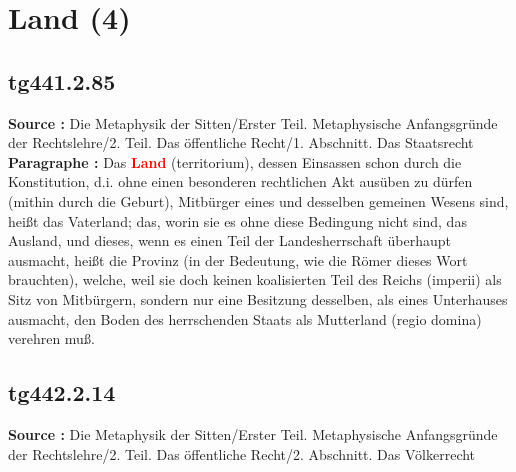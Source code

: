 \documentclass[a4paper,12pt,twoside]{book}
\newcommand{\match}[1]{\textcolor{red}{\textbf{#1}}}
\newcommand{\unnumberedsection}[1]{
	\section*{#1}
	\addcontentsline{toc}{section}{#1}
	\markright{#1}
}
\begin{document}
	\unnumberedsection{Land (4)} 
	\subsection*{tg441.2.85} 
	\textbf{Source : }Die Metaphysik der Sitten/Erster Teil. Metaphysische Anfangsgründe der Rechtslehre/2. Teil. Das öffentliche Recht/1. Abschnitt. Das Staatsrecht\\  
	
	\textbf{Paragraphe : }Das \match{Land} (territorium), dessen Einsassen schon durch die Konstitution, d.i. ohne einen besonderen rechtlichen Akt ausüben zu dürfen (mithin durch die Geburt), Mitbürger eines und desselben gemeinen Wesens sind, heißt das Vaterland; das, worin sie es ohne diese Bedingung nicht sind, das Ausland, und dieses, wenn es einen Teil der Landesherrschaft überhaupt ausmacht, heißt die Provinz (in der Bedeutung, wie die Römer dieses Wort brauchten), welche, weil sie doch keinen koalisierten Teil des Reichs (imperii) als Sitz von Mitbürgern, sondern nur eine Besitzung desselben, als eines Unterhauses ausmacht, den Boden des herrschenden Staats als Mutterland (regio domina) verehren muß. 
	
	\subsection*{tg442.2.14} 
	\textbf{Source : }Die Metaphysik der Sitten/Erster Teil. Metaphysische Anfangsgründe der Rechtslehre/2. Teil. Das öffentliche Recht/2. Abschnitt. Das Völkerrecht\\  
	
\end{document}
